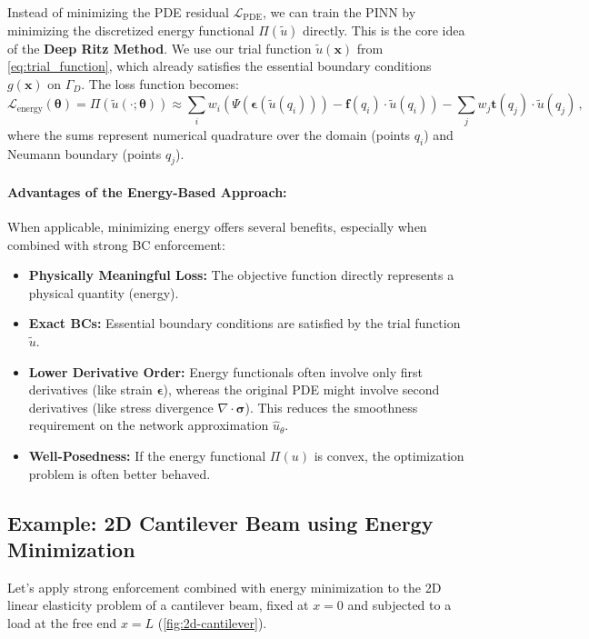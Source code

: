Instead of minimizing the PDE residual $\mathcal{L}_{\text{PDE}}$, we can train the PINN by minimizing the discretized energy functional $\Pi(\tilde{u})$ directly. This is the core idea of the \textbf{Deep Ritz Method}. We use our trial function $\tilde{u}(\mathbf{x})$ from \cref{eq:trial_function}, which already satisfies the essential boundary conditions $g(\mathbf{x})$ on $\Gamma_D$. The loss function becomes:
%
\begin{equation*}
\mathcal{L}_{\text{energy}}(\boldsymbol{\theta}) = \Pi(\tilde{u}(\cdot; \boldsymbol{\theta})) \approx \sum_{i} w_i \left( \Psi(\boldsymbol{\epsilon}(\tilde{u}(q_i))) - \mathbf{f}(q_i) \cdot \tilde{u}(q_i) \right) - \sum_{j} w_j \mathbf{t}(q_j) \cdot \tilde{u}(q_j)\,,
\end{equation*}
%
where the sums represent numerical quadrature over the domain (points $q_i$) and Neumann boundary (points $q_j$).

\paragraph{Advantages of the Energy-Based Approach:}
When applicable, minimizing energy offers several benefits, especially when combined with strong BC enforcement:
\begin{itemize}
    \item \textbf{Physically Meaningful Loss:} The objective function directly represents a physical quantity (energy).
    \item \textbf{Exact BCs:} Essential boundary conditions are satisfied by the trial function $\tilde{u}$.
    \item \textbf{Lower Derivative Order:} Energy functionals often involve only first derivatives (like strain $\boldsymbol{\epsilon}$), whereas the original PDE might involve second derivatives (like stress divergence $\nabla \cdot \boldsymbol{\sigma}$). This reduces the smoothness requirement on the network approximation $\hat{u}_\theta$.
    \item \textbf{Well-Posedness:} If the energy functional $\Pi(u)$ is convex, the optimization problem is often better behaved.
\end{itemize}

\subsection{Example: 2D Cantilever Beam using Energy Minimization}
\label{subsec:cantilever_strong}

Let's apply strong enforcement combined with energy minimization to the 2D linear elasticity problem of a cantilever beam, fixed at $x=0$ and subjected to a load at the free end $x=L$ (\cref{fig:2d-cantilever}).

